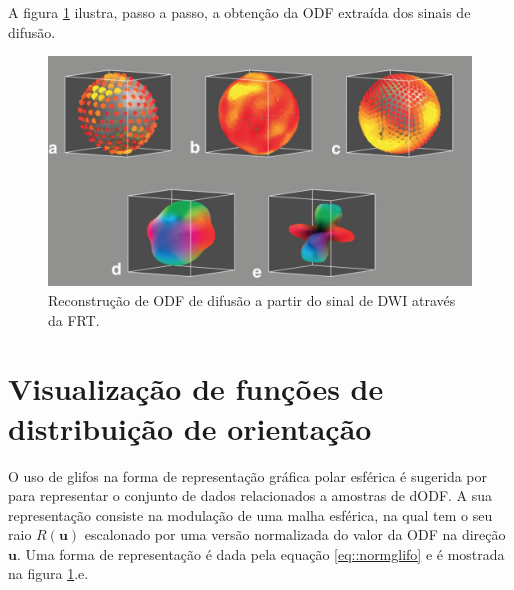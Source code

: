 \documentclass[
    12pt,                %
    oneside,            %
    a4paper,            %
    english,            %
    french,                %
    spanish,            %
    brazil                %
    ]{abntex2}
\begin{document}
A figura \ref{fig::Esquema_QBall} ilustra, passo a passo, a obtenção da ODF extraída dos sinais de difusão.


\begin{figure}[H]

    \centering

    \includegraphics[width=0.9\linewidth, angle=0]{figs/Exemplo_Trabalhos_Relacionados/Esquema_QBall.png}
    \caption{Reconstrução de ODF de difusão a partir do sinal de DWI através da FRT.}
    \label{fig::Esquema_QBall}
\end{figure}

\section{Visualização de funções de distribuição de orientação}
\label{sec::trabalhos_relacionados_glifos}

O uso de glifos na forma de representação gráfica polar esférica é sugerida por  para representar o conjunto de dados relacionados a amostras de dODF. A sua representação consiste na modulação de uma malha esférica, na qual tem o seu raio $R(\textbf{u})$ escalonado por uma versão normalizada do valor da ODF na direção $\textbf{u}$. Uma forma de representação é dada pela equação \ref{eq::normglifo} e é mostrada na figura \ref{fig::Esquema_QBall}.e.
\end{document}

